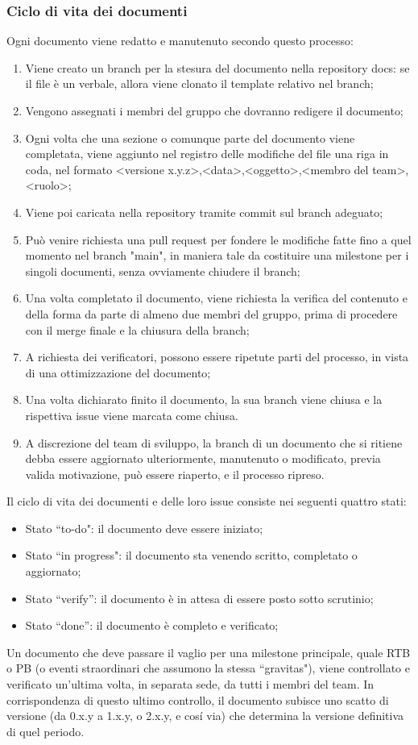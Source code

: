 \subsubsection{Ciclo di vita dei documenti}
Ogni documento viene redatto e manutenuto secondo questo processo:
\begin{enumerate}
    \item Viene creato un branch per la stesura del documento nella repository docs: se il file è un verbale, allora viene clonato il template relativo nel branch;
    \item Vengono assegnati i membri del gruppo che dovranno redigere il documento; 
    \item Ogni volta che una sezione o comunque parte del documento viene completata, viene aggiunto nel registro delle modifiche del file una riga in coda, nel formato <versione x.y.z>,<data>,<oggetto>,<membro del team>,<ruolo>;  
    \item Viene poi caricata nella repository tramite commit sul branch adeguato;
    \item Può venire richiesta una pull request per fondere le modifiche fatte fino a quel momento nel branch "main", in maniera tale da costituire una milestone per i singoli documenti, senza ovviamente chiudere il branch;
    \item Una volta completato il documento, viene richiesta la verifica del contenuto e della forma da parte di almeno due membri del gruppo, prima di procedere con il merge finale e la chiusura della branch; 
    \item A richiesta dei verificatori, possono essere ripetute parti del processo, in vista di una ottimizzazione del documento;
    \item Una volta dichiarato finito il documento, la sua branch viene chiusa e la rispettiva issue viene marcata come chiusa.
    \item A discrezione del team di sviluppo, la branch di un documento che si ritiene debba essere aggiornato ulteriormente, manutenuto o modificato, previa valida motivazione, può essere riaperto, e il processo ripreso. 
\end{enumerate}
Il ciclo di vita dei documenti e delle loro issue consiste nei seguenti quattro stati:
\begin{itemize} 
    \item Stato ``to-do": il documento deve essere iniziato;
    \item Stato ``in progress": il documento sta venendo scritto, completato o aggiornato;
    \item Stato ``verify'': il documento è in attesa di essere posto sotto scrutinio;
    \item Stato ``done'': il documento è completo e verificato;
\end{itemize}
Un documento che deve passare il vaglio per una milestone principale, quale RTB o PB (o eventi straordinari che assumono la stessa ``gravitas"), viene controllato e verificato un'ultima volta, in separata sede, da tutti i membri del team.
In corrispondenza di questo ultimo controllo, il documento subisce uno scatto di versione (da 0.x.y a 1.x.y, o 2.x.y, e cosí via) che determina la versione definitiva di quel periodo.

